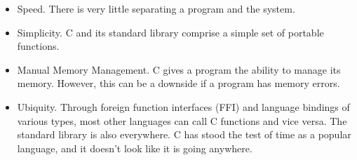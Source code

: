 \begin{itemize}
	\item Speed. There is very little separating a program and the system.
	\item Simplicity.
    C and its standard library comprise a simple set of portable functions.
	\item Manual Memory Management.
    C gives a program the ability to manage its memory.
    However, this can be a downside if a program has memory errors.
  \item Ubiquity.
    Through foreign function interfaces (FFI) and language bindings of various types, most other languages can call C functions and vice versa.
    The standard library is also everywhere.
    C has stood the test of time as a popular language, and it doesn't look like it is going anywhere.
\end{itemize}


